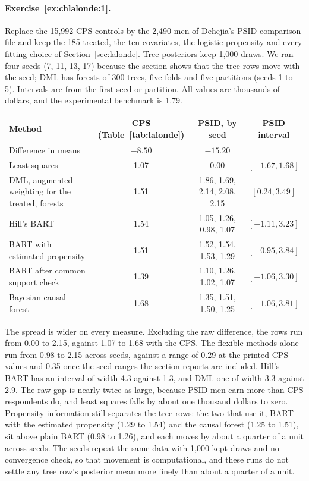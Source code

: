 \paragraph{Exercise~\ref{ex:chlalonde:1}.} Replace the 15,992 CPS controls by the 2,490 men of Dehejia's PSID comparison file and keep the 185 treated, the ten covariates, the logistic propensity and every fitting choice of Section~\ref{sec:lalonde}. Tree posteriors keep 1,000 draws. We ran four seeds (7, 11, 13, 17) because the section shows that the tree rows move with the seed; DML has forests of 300 trees, five folds and five partitions (seeds 1 to 5). Intervals are from the first seed or partition. All values are thousands of dollars, and the experimental benchmark is 1.79.
\begin{center}
\small
\begin{tabular}{@{}p{3.7cm}ccc@{}}
\toprule
Method & CPS (Table~\ref{tab:lalonde}) & PSID, by seed & PSID interval \\
\midrule
Difference in means & $-8.50$ & $-15.20$ & \\
Least squares & 1.07 & 0.00 & $[-1.67, 1.68]$ \\
DML, augmented weighting for the treated, forests & 1.51 & 1.86, 1.69, 2.14, 2.08, 2.15 & $[0.24, 3.49]$ \\
Hill's BART & 1.54 & 1.05, 1.26, 0.98, 1.07 & $[-1.11, 3.23]$ \\
BART with estimated propensity & 1.51 & 1.52, 1.54, 1.53, 1.29 & $[-0.95, 3.84]$ \\
BART after common support check & 1.39 & 1.10, 1.26, 1.02, 1.07 & $[-1.06, 3.30]$ \\
Bayesian causal forest & 1.68 & 1.35, 1.51, 1.50, 1.25 & $[-1.06, 3.81]$ \\
\bottomrule
\end{tabular}
\end{center}
The spread is wider on every measure. Excluding the raw difference, the rows run from 0.00 to 2.15, against 1.07 to 1.68 with the CPS. The flexible methods alone run from 0.98 to 2.15 across seeds, against a range of 0.29 at the printed CPS values and 0.35 once the seed ranges the section reports are included. Hill's BART has an interval of width 4.3 against 1.3, and DML one of width 3.3 against 2.9. The raw gap is nearly twice as large, because PSID men earn more than CPS respondents do, and least squares falls by about one thousand dollars to zero. Propensity information still separates the tree rows: the two that use it, BART with the estimated propensity (1.29 to 1.54) and the causal forest (1.25 to 1.51), sit above plain BART (0.98 to 1.26), and each moves by about a quarter of a unit across seeds. The seeds repeat the same data with 1,000 kept draws and no convergence check, so that movement is computational, and these runs do not settle any tree row's posterior mean more finely than about a quarter of a unit.

